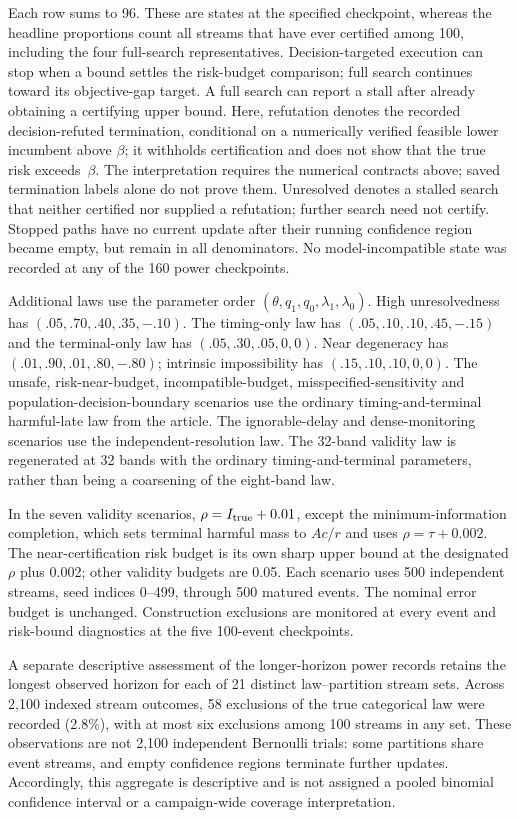 Each row sums to 96. These are states at the specified checkpoint, whereas the headline proportions count all streams that have ever certified among 100, including the four full-search representatives. Decision-targeted execution can stop when a bound settles the risk-budget comparison; full search continues toward its objective-gap target. A full search can report a stall after already obtaining a certifying upper bound. Here, refutation denotes the recorded decision-refuted termination, conditional on a numerically verified feasible lower incumbent above $\beta$; it withholds certification and does not show that the true risk exceeds~$\beta$. The interpretation requires the numerical contracts above; saved termination labels alone do not prove them. Unresolved denotes a stalled search that neither certified nor supplied a refutation; further search need not certify. Stopped paths have no current update after their running confidence region became empty, but remain in all denominators. No model-incompatible state was recorded at any of the 160 power checkpoints.

{\sloppy Additional laws use the parameter order $(\theta,q_1,q_0,\lambda_1,\lambda_0)$. High unresolvedness has $(.05,.70,.40,.35,-.10)$. The timing-only law has $(.05,.10,.10,.45,-.15)$ and the terminal-only law has $(.05,.30,.05,0,0)$. Near degeneracy has $(.01,.90,.01,.80,-.80)$; intrinsic impossibility has $(.15,.10,.10,0,0)$. The unsafe, risk-near-budget, incompatible-budget, misspecified-sensitivity and population-decision-boundary scenarios use the ordinary timing-and-terminal harmful-late law from the article. The ignorable-delay and dense-monitoring scenarios use the independent-resolution law. The 32-band validity law is regenerated at 32 bands with the ordinary timing-and-terminal parameters, rather than being a coarsening of the eight-band law.\par}

In the seven validity scenarios, $\rho=I_{\rm true}+0.01$, except the minimum-information completion, which sets terminal harmful mass to $Ac/r$ and uses $\rho=\tau+0.002$. The near-certification risk budget is its own sharp upper bound at the designated $\rho$ plus 0.002; other validity budgets are 0.05. Each scenario uses 500 independent streams, seed indices 0--499, through 500 matured events. The nominal error budget is unchanged. Construction exclusions are monitored at every event and risk-bound diagnostics at the five 100-event checkpoints.

A separate descriptive assessment of the longer-horizon power records retains the longest observed horizon for each of 21 distinct law--partition stream sets. Across 2,100 indexed stream outcomes, 58 exclusions of the true categorical law were recorded (2.8\%), with at most six exclusions among 100 streams in any set. These observations are not 2,100 independent Bernoulli trials: some partitions share event streams, and empty confidence regions terminate further updates. Accordingly, this aggregate is descriptive and is not assigned a pooled binomial confidence interval or a campaign-wide coverage interpretation.


